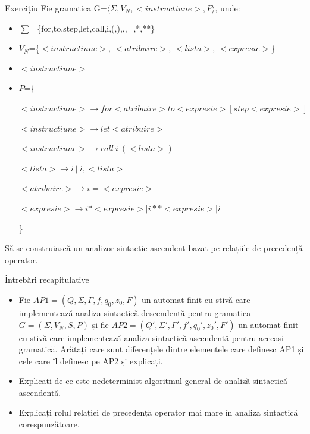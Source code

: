 \documentclass[pdf]{beamer}
\begin{document}
\begin{frame}{Exercițiu}
Fie gramatica G=$\langle \Sigma, V_N, <instructiune>, P \rangle$, unde:

\begin{itemize}
\item
$\sum$=\{for,to,step,let,call,i,(,),,,=,*,**\}
\item
$V_N$=\{$<instructiune>$, $<atribuire>$, $<lista>$, $<expresie>$\}
\item
$<instructiune>$
\item
$P$=\{

$<instructiune> \rightarrow for <atribuire> to <expresie> [ step <expresie> ]$

$<instructiune> \rightarrow let <atribuire>$

$<instructiune> \rightarrow call \ i \ (<lista>)$

$<lista> \rightarrow i \ | \ i, <lista>$

$<atribuire> \rightarrow i = <expresie>$

$<expresie> \rightarrow i * <expresie> | i** <expresie> | i$

\}
\end{itemize}
Să se construiască un analizor sintactic ascendent bazat pe relațiile de precedență operator.
\end{frame}



\begin{frame}{Întrebări recapitulative}
\begin{itemize}
\item
Fie $AP1=(Q, \Sigma, \Gamma, f, q_0, z_0, F)$ un automat finit cu stivă care implementează analiza sintactică descendentă pentru gramatica $G=(\Sigma, V_N, S, P)$ și fie $AP2=(Q', \Sigma ', \Gamma ', f', q_0 ', z_0 ', F')$ un automat finit cu stivă care implementează analiza sintactică ascendentă pentru aceeași gramatică. Arătați care sunt diferențele dintre elementele care definesc AP1 și cele care îl definesc pe AP2 și explicați.
\newline

\item
Explicați de ce este nedeterminist algoritmul general de analiză sintactică ascendentă.
\newline

\item
Explicați rolul relației de precedență operator mai mare în analiza sintactică corespunzătoare.

\end{itemize}
\end{frame}
\end{document}
